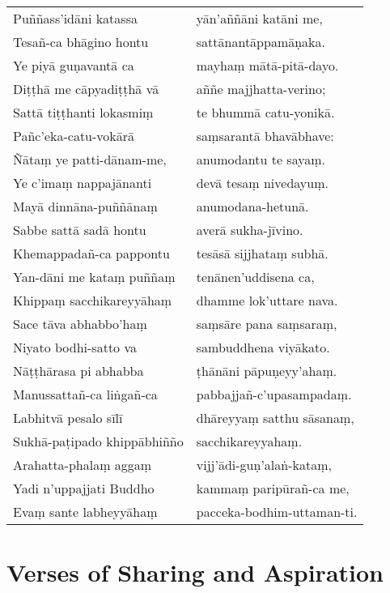 \begin{tabularx}{\linewidth}{@{}l l@{}}
Puññass'idāni katassa & yān'aññāni katāni me,\\
Tesañ-ca bhāgino hontu & sattānantāppamāṇaka.\\
Ye piyā guṇavantā ca & mayhaṃ mātā-pitā-dayo.\\
Diṭṭhā me cāpyadiṭṭhā vā & aññe majjhatta-verino;\\
Sattā tiṭṭhanti lokasmiṃ & te bhummā catu-yonikā.\\
Pañc'eka-catu-vokārā & saṃsarantā bhavābhave:\\
Ñātaṃ ye patti-dānam-me, & anumodantu te sayaṃ.\\
Ye c'imaṃ nappajānanti & devā tesaṃ nivedayuṃ.\\
Mayā dinnāna-puññānaṃ & anumodana-hetunā.\\
Sabbe sattā sadā hontu & averā sukha-jīvino.\\
Khemappadañ-ca pappontu & tesāsā sijjhataṃ subhā.\\
%
% 
% 
Yan-dāni me kataṃ puññaṃ & tenānen'uddisena ca,\\
Khippaṃ sacchikareyyāhaṃ & dhamme lok'uttare nava.\\
Sace tāva abhabbo'haṃ & saṃsāre pana saṃsaraṃ,\\
Niyato bodhi-satto va & sambuddhena viyākato.\\
Nāṭṭhārasa pi abhabba & ṭhānāni pāpuṇeyy'ahaṃ.\\
Manussattañ-ca liṅgañ-ca & pabbajjañ-c'upasampadaṃ.\\
Labhitvā pesalo sīlī & dhāreyyaṃ satthu sāsanaṃ,\\
Sukhā-paṭipado khippābhiñño & sacchikareyyahaṃ.\\
Arahatta-phalaṃ aggaṃ & vijj'ādi-guṇ'alaṅ-kataṃ,\\
Yadi n'uppajjati Buddho & kammaṃ paripūrañ-ca me,\\
Evaṃ sante labheyyāhaṃ & pacceka-bodhim-uttaman-ti.
\end{tabularx}

\section{Verses of Sharing and Aspiration}

\begin{leader}
\end{leader}

